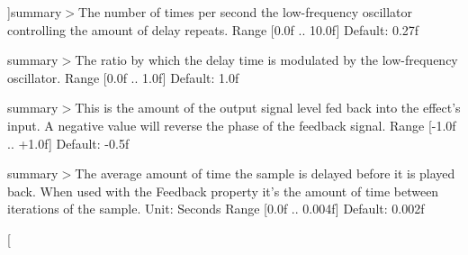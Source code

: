 \begin{Desc}
\begin{description}
{}]summary$>$The number of times per second the low-\/frequency oscillator controlling the amount of delay repeats. Range \mbox{[}0.\-0f .. 10.\-0f\mbox{]} Default\-: 0.\-27f\item[{\em 
\hypertarget{namespace_open_t_k_1_1_audio_1_1_open_a_l_aa0356299908369b4365d28572c0ec20baa49f040c000b878842a4179a3b675af7}{Flanger\-Rate}\label{namespace_open_t_k_1_1_audio_1_1_open_a_l_aa0356299908369b4365d28572c0ec20baa49f040c000b878842a4179a3b675af7}
}]summary$>$The ratio by which the delay time is modulated by the low-\/frequency oscillator. Range \mbox{[}0.\-0f .. 1.\-0f\mbox{]} Default\-: 1.\-0f\item[{\em 
\hypertarget{namespace_open_t_k_1_1_audio_1_1_open_a_l_aa0356299908369b4365d28572c0ec20ba364949f5e31b7482daab1aa89632a9dd}{Flanger\-Depth}\label{namespace_open_t_k_1_1_audio_1_1_open_a_l_aa0356299908369b4365d28572c0ec20ba364949f5e31b7482daab1aa89632a9dd}
}]summary$>$This is the amount of the output signal level fed back into the effect's input. A negative value will reverse the phase of the feedback signal. Range \mbox{[}-\/1.\-0f .. +1.0f\mbox{]} Default\-: -\/0.\-5f\item[{\em 
\hypertarget{namespace_open_t_k_1_1_audio_1_1_open_a_l_aa0356299908369b4365d28572c0ec20baeb392ca715df7f1e39298e764a2d2c51}{Flanger\-Feedback}\label{namespace_open_t_k_1_1_audio_1_1_open_a_l_aa0356299908369b4365d28572c0ec20baeb392ca715df7f1e39298e764a2d2c51}
}]summary$>$The average amount of time the sample is delayed before it is played back. When used with the Feedback property it's the amount of time between iterations of the sample. Unit\-: Seconds Range \mbox{[}0.\-0f .. 0.\-004f\mbox{]} Default\-: 0.\-002f\item[{\em 
}
\end{description}
\end{Desc}
